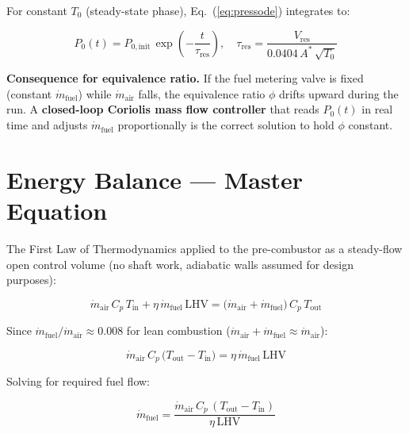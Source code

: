 \documentclass[12pt,a4paper]{report}
\begin{document}
For constant $T_0$ (steady-state phase), Eq.~(\ref{eq:pressode}) integrates to:

\begin{equation}
  P_0(t) = P_{0,\text{init}}\,\exp\!\left(-\frac{t}{\tau_\text{res}}\right),
  \quad
  \tau_\text{res} = \frac{V_\text{res}}{0.0404\,A^*\,\sqrt{T_0}}
\end{equation}

\begin{warnbox}
\textbf{Consequence for equivalence ratio.}
If the fuel metering valve is fixed (constant $\dot{m}_\text{fuel}$) while
$\dot{m}_\text{air}$ falls, the equivalence ratio $\phi$ drifts upward during
the run.  A \textbf{closed-loop Coriolis mass flow controller} that reads
$P_0(t)$ in real time and adjusts $\dot{m}_\text{fuel}$ proportionally is the
correct solution to hold $\phi$ constant.
\end{warnbox}

\section{Energy Balance — Master Equation}

The First Law of Thermodynamics applied to the pre-combustor as a steady-flow
open control volume (no shaft work, adiabatic walls assumed for design
purposes):

\begin{formulabox}
\begin{equation}
  \dot{m}_\text{air}\,C_p\,T_\text{in}
  + \eta\,\dot{m}_\text{fuel}\,\text{LHV}
  = \bigl(\dot{m}_\text{air}+\dot{m}_\text{fuel}\bigr)\,C_p\,T_\text{out}
  \label{eq:energyfull}
\end{equation}
\end{formulabox}

Since $\dot{m}_\text{fuel}/\dot{m}_\text{air}\approx 0.008$ for lean
combustion ($\dot{m}_\text{air}+\dot{m}_\text{fuel}\approx\dot{m}_\text{air}$):

\begin{formulabox}
\begin{equation}
  \boxed{
    \dot{m}_\text{air}\,C_p\,\bigl(T_\text{out}-T_\text{in}\bigr)
    = \eta\,\dot{m}_\text{fuel}\,\text{LHV}
  }
  \label{eq:energy}
\end{equation}
\end{formulabox}

\noindent Solving for required fuel flow:

\begin{equation}
  \dot{m}_\text{fuel}
  = \frac{\dot{m}_\text{air}\,C_p\,(T_\text{out}-T_\text{in})}
         {\eta\,\text{LHV}}
  \label{eq:fuelflow}
\end{equation}
\end{document}
